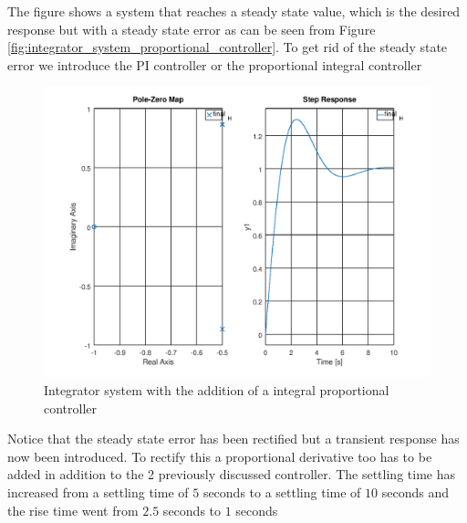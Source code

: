 \documentclass[a4paper, 12pt]{article}
\begin{document}
The figure shows a system that reaches a steady state value, which is the desired response but with a steady state error as can be seen from Figure \ref{fig:integrator_system_proportional_controller}. To get rid of the steady state error we introduce the PI controller or the proportional integral controller

\begin{figure}[H]
	\centering
	\includegraphics[width=\textwidth]{integrator_system_proportional_integral_controller.png}
	\caption{Integrator system with the addition of a integral proportional controller}
	\label{fig:integrator_system_proportional_integral_controller}
\end{figure}

Notice that the steady state error has been rectified but a transient response has now been introduced. To rectify this a proportional derivative too has to be added in addition to the 2 previously discussed controller. The settling time has increased from a settling time of $5$ seconds to a settling time of $10$ seconds and the rise time went from $2.5$ seconds to $1$ seconds
\end{document}
